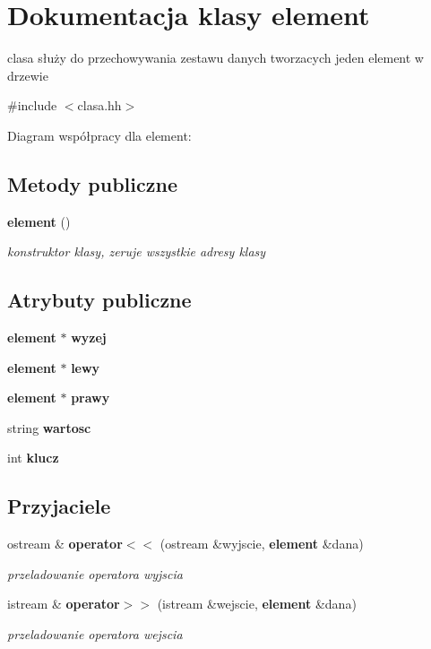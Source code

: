 \section{\-Dokumentacja klasy element}
\label{classelement}


clasa służy do przechowywania zestawu danych tworzacych jeden element w drzewie  




{\ttfamily \#include $<$clasa.\-hh$>$}



\-Diagram współpracy dla element\-:
\subsection*{\-Metody publiczne}
\begin{DoxyCompactItemize}
\item 
{\bf element} ()
\begin{DoxyCompactList}\small\item\em konstruktor klasy, zeruje wszystkie adresy klasy \end{DoxyCompactList}\end{DoxyCompactItemize}
\subsection*{\-Atrybuty publiczne}
\begin{DoxyCompactItemize}
\item 
{\bf element} $\ast$ {\bf wyzej}
\item 
{\bf element} $\ast$ {\bf lewy}
\item 
{\bf element} $\ast$ {\bf prawy}
\item 
string {\bf wartosc}
\item 
int {\bf klucz}
\end{DoxyCompactItemize}
\subsection*{\-Przyjaciele}
\begin{DoxyCompactItemize}
\item 
ostream \& {\bf operator$<$$<$} (ostream \&wyjscie, {\bf element} \&dana)
\begin{DoxyCompactList}\small\item\em przeladowanie operatora wyjscia \end{DoxyCompactList}\item 
istream \& {\bf operator$>$$>$} (istream \&wejscie, {\bf element} \&dana)
\begin{DoxyCompactList}\small\item\em przeladowanie operatora wejscia \end{DoxyCompactList}\end{DoxyCompactItemize}


